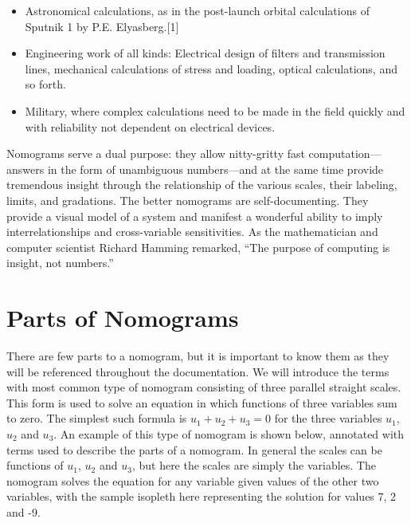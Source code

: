 \documentclass[a4paper,11pt,english]{sphinxmanual}
\begin{document}
\begin{itemize}
\item {} 
Astronomical calculations, as in the post-launch orbital calculations of Sputnik 1 by P.E. Elyasberg.{[}1{]}

\item {} 
Engineering work of all kinds: Electrical design of filters and transmission lines, mechanical calculations of stress and loading, optical calculations, and so forth.

\item {} 
Military, where complex calculations need to be made in the field quickly and with reliability not dependent on electrical devices.

\end{itemize}

Nomograms serve a dual purpose: they allow nitty-gritty fast computation—answers in the form of unambiguous numbers—and at the same time provide tremendous insight through the relationship of the various scales, their labeling, limits, and gradations. The better nomograms are self-documenting. They provide a visual model of a system and manifest a wonderful ability to imply interrelationships and cross-variable sensitivities. As the mathematician and computer scientist Richard Hamming remarked, “The purpose of computing is insight, not numbers.”


\section{Parts of Nomograms}
\label{\detokenize{introduction/introduction:parts-of-nomograms}}
There are few parts to a nomogram, but it is important to know them as they will be referenced throughout the documentation. We will introduce the terms with most common type of nomogram consisting of three parallel straight scales. This form is used to solve an equation in which functions of three variables sum to zero. The simplest such formula is \(u_1 + u_2 + u_3 = 0\) for the three variables \(u_1\), \(u_2\) and \(u_3\). An example of this type of nomogram is shown below, annotated with terms used to describe the parts of a nomogram. In general the scales can be functions of \(u_1\), \(u_2\) and \(u_3\), but here the scales are simply the variables. The nomogram solves the equation for any variable given values of the other two variables, with the sample isopleth here representing the solution for values 7, 2 and -9.

\end{document}
